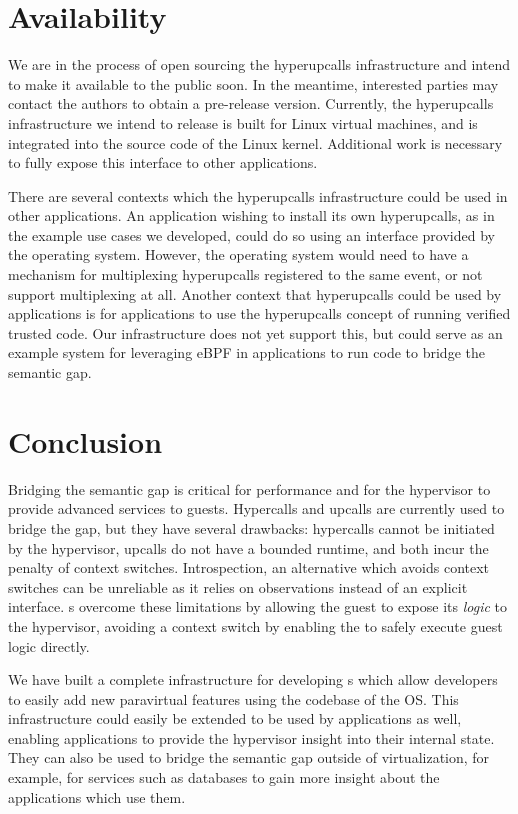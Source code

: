 \documentclass[11pt]{article}
\begin{document}
\section{Availability}
\label{sec:availability}

We are in the process of open sourcing the hyperupcalls infrastructure and intend to make it available to the public soon. 
In the meantime, interested parties may contact the authors to obtain a pre-release version. Currently, the hyperupcalls
infrastructure we intend to release is built for Linux virtual machines, and is integrated into the source code of the
Linux kernel. Additional work is necessary to fully expose this interface to other applications.

There are several contexts which the hyperupcalls infrastructure could be used in other applications. An application wishing
to install its own hyperupcalls, as in the example use cases we developed, could do so using an interface provided 
by the operating system. However, the operating system would need to have a mechanism for multiplexing hyperupcalls
registered to the same event, or not support multiplexing at all. Another context that hyperupcalls could be used
by applications is for applications to use the hyperupcalls concept of running verified trusted code. Our infrastructure
does not yet support this, but could serve as an example system for leveraging eBPF in applications to run code to 
bridge the semantic gap.

\section{Conclusion}
\label{sec:conclusion}

Bridging the semantic gap is critical for performance and for the hypervisor to
provide advanced services to guests. Hypercalls and upcalls are currently used to
bridge the gap, but they have several drawbacks: hypercalls cannot be initiated 
by the hypervisor, upcalls do not have a bounded runtime, and both incur the
penalty of context switches. Introspection,
an alternative which avoids context switches can be unreliable as it relies on
observations instead of an explicit interface. \Hypercallback{}s overcome 
these limitations by allowing the guest to expose its \emph{logic} to the hypervisor,
avoiding a context switch by enabling the \hypercallback{} to safely execute guest
logic directly.


We have built a complete infrastructure for developing \hypercallback{}s which
allow developers to easily add new paravirtual features using the codebase of the OS. This
infrastructure could easily be extended to be used by applications as well, enabling
applications to provide the hypervisor insight into their internal state. They can also be 
used to bridge the semantic gap outside of virtualization, for example, for services such
as databases to gain more insight about the applications which use them.
\end{document}
